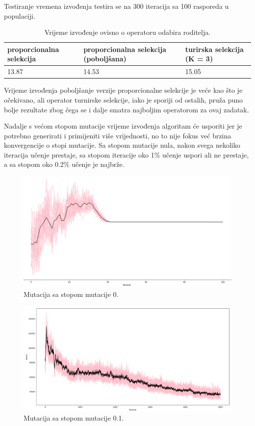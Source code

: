 \documentclass[times, utf8, zavrsni]{fer}
\begin{document}
Testiranje vremena izvođenja  testira se na 300 iteracija sa 100 rasporeda u populaciji.

\begin{table}[htb]
\caption{Vrijeme izvođenje ovisno o operatoru odabira roditelja.}
\label{tbl:iter-roditelj}
\centering
\begin{tabular}{lll} \hline
proporcionalna selekcija & proporcionalna selekcija (poboljšana) &  turirska selekcija (K = 3)\\ \hline
13.87 & 14.53 & 15.05\\ \hline
\end{tabular}
\end{table}

Vrijeme izvođenja poboljšanje verzije proporcionalne selekcije je veće kao što je očekivano, ali operator turnirske selekcije, iako je sporiji od ostalih, pruža puno bolje rezultate zbog čega se i dalje smatra najboljim operatorom za ovaj zadatak.

Nadalje s većom stopom mutacije vrijeme izvođenja algoritam će usporiti jer je potrebno generirati i primijeniti više vrijednosti, no to nije fokus već brzina konvergencije o stopi mutacije. Sa stopom mutacije nula, nakon svega nekoliko iteracija učenje prestaje, sa stopom iteracije oko 1\% učenje uspori ali ne prestaje, a sa stopom oko 0.2\% učenje je najbrže.

\newpage

\begin{figure}[htb]
\centering
\includegraphics[width=14cm]{images/mutacija_nula.png}
\caption{Mutacija sa stopom mutacije 0.}
\label{fig:mutacija_nula}
\end{figure}

\begin{figure}[htb]
\centering
\includegraphics[width=14cm]{images/mutacija_velika.png}
\caption{Mutacija sa stopom mutacije 0.1.}
\label{fig:mutacija_velika}
\end{figure}
\end{document}
